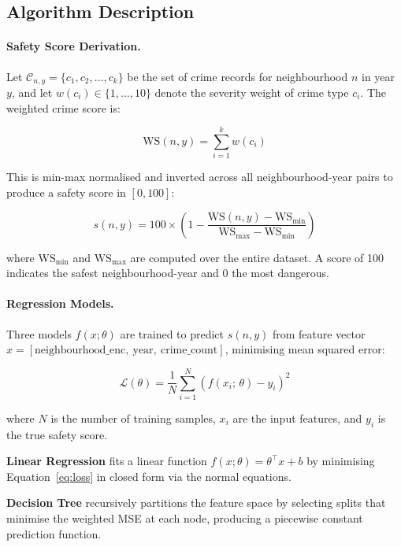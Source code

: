 \documentclass{article}
\begin{document}
\subsection{Algorithm Description}

\paragraph{Safety Score Derivation.}
Let $\mathcal{C}_{n,y} = \{c_1, c_2, \ldots, c_k\}$ be the set of crime records
for neighbourhood $n$ in year $y$, and let $w(c_i) \in \{1, \ldots, 10\}$ denote
the severity weight of crime type $c_i$. The weighted crime score is:

\begin{equation}
  \text{WS}(n, y) = \sum_{i=1}^{k} w(c_i)
\end{equation}

This is min-max normalised and inverted across all neighbourhood-year pairs to
produce a safety score in $[0, 100]$:

\begin{equation}
  s(n, y) = 100 \times \left(1 - \frac{\text{WS}(n,y) - \text{WS}_{\min}}
  {\text{WS}_{\max} - \text{WS}_{\min}}\right)
  \label{eq:safety}
\end{equation}

where $\text{WS}_{\min}$ and $\text{WS}_{\max}$ are computed over the entire
dataset. A score of 100 indicates the safest neighbourhood-year and 0 the most
dangerous.

\paragraph{Regression Models.}
Three models $f(x;\theta)$ are trained to predict $s(n,y)$ from feature vector
$x = [\text{neighbourhood\_enc},\ \text{year},\ \text{crime\_count}]$, minimising
mean squared error:

\begin{equation}
  \mathcal{L}(\theta) = \frac{1}{N} \sum_{i=1}^{N}
  \left(f(x_i;\,\theta) - y_i\right)^2
  \label{eq:loss}
\end{equation}

where $N$ is the number of training samples, $x_i$ are the input features, and
$y_i$ is the true safety score.

\textbf{Linear Regression} fits a linear function
$f(x;\theta) = \theta^\top x + b$ by minimising Equation~\ref{eq:loss} in closed
form via the normal equations.

\textbf{Decision Tree} \cite{quinlan1986induction} recursively partitions the
feature space by selecting splits that minimise the weighted MSE at each node,
producing a piecewise constant prediction function.
\end{document}
